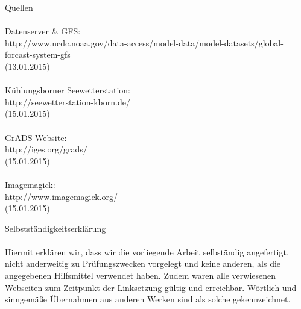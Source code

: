 \documentclass[a4paper,oneside,12pt,titlepage]{article}
\begin{document}
\newpage
\Large{Quellen}
\\
\\
\small{
Datenserver \& GFS:\\
http://www.ncdc.noaa.gov/data-access/model-data/model-datasets/global-forcast-system-gfs \\(13.01.2015)\\\\
Kühlungsborner Seewetterstation:\\
http://seewetterstation-kborn.de/ \\(15.01.2015)\\\\
GrADS-Website:\\
http://iges.org/grads/ \\(15.01.2015)\\\\
Imagemagick:\\
http://www.imagemagick.org/ \\(15.01.2015)\\
}



\newpage
\Large{Selbstständigkeitserklärung}\\
\\
\small Hiermit erklären wir, dass wir die vorliegende Arbeit selbständig angefertigt, nicht anderweitig zu Prüfungszwecken vorgelegt und keine anderen, als die angegebenen Hilfsmittel verwendet haben. Zudem waren alle verwiesenen Webseiten zum Zeitpunkt der Linksetzung gültig und erreichbar. Wörtlich und sinngemäße Übernahmen aus anderen Werken sind als solche gekennzeichnet.
\\ 
\end{document}

